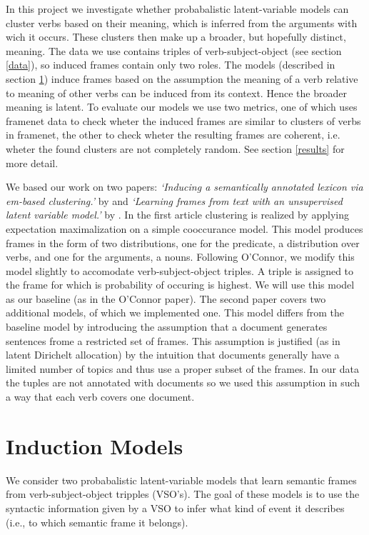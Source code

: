 \documentclass{article} %
\begin{document}
In this project we investigate whether probabalistic latent-variable models can cluster verbs based on their meaning, which is inferred from the arguments with wich it occurs. These clusters then make up a broader, but hopefully distinct, meaning. The data we use contains triples of verb-subject-object (see section \ref{data}), so induced frames contain only two roles. The models (described in section \ref{models}) induce frames based on the assumption the meaning of a verb relative to meaning of other verbs can be induced from its context. Hence the broader meaning is latent. To evaluate our models we use two metrics, one of which uses framenet data to check wheter the induced frames are similar to clusters of verbs in framenet, the other to check wheter the resulting frames are coherent, i.e. wheter the found clusters are not completely random. See section \ref{results} for more detail.

We based our work on two papers: \textit{`Inducing a semantically annotated lexicon via em-based clustering.'} by \citeauthor{rooth1999} and \textit{`Learning frames from text with an unsupervised latent variable model.'} by \citeauthor{oconnor2013}. In the first article clustering is realized by applying expectation maximalization on a simple cooccurance model. This model produces frames in the form of two distributions, one for the predicate, a distribution over verbs, and one for the arguments, a nouns. Following O'Connor, we modify this model slightly to accomodate verb-subject-object triples. A triple is assigned to the frame for which is probability of occuring is highest. We will use this model as our baseline (as in the O'Connor paper). The second paper covers two additional models, of which we implemented one. This model differs from the baseline model by introducing the assumption that a document generates sentences frome a restricted set of frames. This assumption is justified (as in latent Dirichelt allocation) \cite{blei2003} by the intuition that documents generally have a limited number of topics and thus use a proper subset of the frames. In our data the tuples are not annotated with documents so we used this assumption in such a way that each verb covers one document.  


\section{Induction Models}
\label{models}
We consider two probabalistic latent-variable models that learn semantic frames
from verb-subject-object tripples (VSO's).
The goal of these models is to use the syntactic information given by a VSO to
infer what kind of event it describes (i.e., to which semantic frame it belongs).
\end{document}
